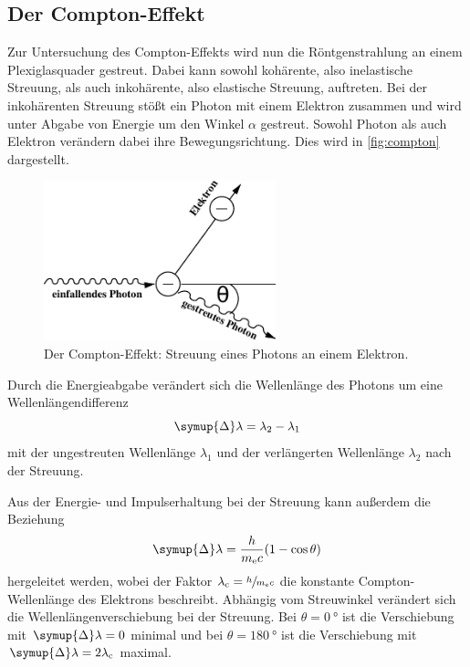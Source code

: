 \subsection{Der Compton-Effekt}
\label{sec:compton_effekt}

    Zur Untersuchung des Compton-Effekts wird nun die Röntgenstrahlung an einem Plexiglasquader gestreut.
    Dabei kann sowohl kohärente, also inelastische Streuung,
    als auch inkohärente, also elastische Streuung,
    auftreten.
    Bei der inkohärenten Streuung stößt ein Photon mit einem Elektron zusammen und wird unter Abgabe von Energie um den Winkel $\alpha$ gestreut.
    Sowohl Photon als auch Elektron verändern dabei ihre Bewegungsrichtung.
    Dies wird in \autoref{fig:compton} dargestellt.
    \begin{figure}[H]
        \centering
        \includegraphics[width=0.6\textwidth]{content/img/Abb_1.pdf}
        \caption{Der Compton-Effekt: Streuung eines Photons an einem Elektron. \cite{versuchsanleitung}}
        \label{fig:compton}
    \end{figure}
    Durch die Energieabgabe verändert sich die Wellenlänge des Photons
    um eine Wellenlängendifferenz
    \begin{equation}
        \symup{\Delta}\lambda = \lambda_2 - \lambda_1
        \label{eqn:wellenlängendifferenz}
    \end{equation}
    mit der ungestreuten Wellenlänge $\lambda_1$ und der verlängerten Wellenlänge $\lambda_2$ nach der Streuung.

    Aus der Energie- und Impulserhaltung bei der Streuung kann außerdem die Beziehung
    \begin{equation}
        \symup{\Delta}\lambda = \frac{h}{m_\text{e} c}(1 - \cos{\theta})
        \label{eqn:verschiebung_winkelabhängig}
    \end{equation}
    hergeleitet werden,
    wobei der Faktor $\lambda_\text{c} = \sfrac{h}{m_\text{e}c}$ die konstante Compton-Wellenlänge des Elektrons beschreibt.
    Abhängig vom Streuwinkel verändert sich die Wellenlängenverschiebung bei der Streuung.
    Bei $\theta = \SI{0}{\degree}$ ist die Verschiebung mit $\symup{\Delta}\lambda = 0$ minimal und
    bei $\theta = \SI{180}{\degree}$ ist die Verschiebung mit $\symup{\Delta}\lambda = 2\lambda_\text{c}$ maximal.
